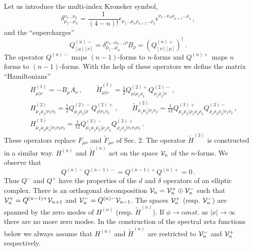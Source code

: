 \documentclass[a4paper,12pt]{article}
\begin{document}
Let us introduce the multi-index Kroneker symbol,
\begin{equation}
\delta_{\mu_1\dots\mu_n}^{\nu_1\dots\nu_n}=\frac 1{(4-n)!}
\epsilon_{\mu_1\dots\mu_n\rho_{n+1}\dots\rho_4}
\epsilon^{\nu_1\dots\nu_n\rho_{n+1}\dots\rho_4} \,,
\label{Kron}
\end{equation}
and the ``supercharges''
\begin{equation}
Q^{(n)-}_{[\mu ][\nu ]}=
\delta_{\mu_1\dots\mu_n}^{\nu_1\dots\nu_{n-1}\rho} B_\rho
=\left( Q^{(n)+}_{[\nu ][\mu ]} \right)^\dag \,.
\label{Q+-}
\end{equation}
The operator $Q^{(n)-}$ maps $(n-1)$-forms to $n$-forms and
$Q^{(n)+}$ maps $n$ forms to $(n-1)$-forms.
With the help of these operators we define the matrix
``Hamiltonians''
\begin{eqnarray}
&&H^{(1)}_{\mu |\nu}=-B_\mu A_\nu \,,\qquad
\tilde H^{(1)}_{\mu |\nu}=\frac 12 Q^{(2)+}_{\mu |\rho_1\rho_2}
Q^{(2)-}_{\rho_1\rho_2 |\nu} \,,           \nonumber \\
&&H^{(2)}_{\mu_1\mu_2 |\nu_1\nu_2}=\frac 12 
Q^{(2)-}_{\mu_1\mu_2 |\rho}Q^{(2)+}_{\rho |\nu_1\nu_2 }\,,
\qquad \tilde H^{(2)}_{\mu_1\mu_2 |\nu_1\nu_2}= \frac 1{12}
Q^{(3)+}_{\mu_1\mu_2 |\rho_1\rho_2\rho_3}
Q^{(3)-}_{\rho_1\rho_2\rho_3 |\nu_1\nu_2 } \,,      \nonumber \\
&&H^{(3)}_{ \mu_1\mu_2\mu_3 |\nu_1\nu_2\nu_3}=\frac 1{12}
Q^{(3)-}_{\mu_1\mu_2\mu_3 |\rho_1\rho_2}
Q^{(3)+}_{\rho_1\rho_2 |\nu_1\nu_2\nu_3} \,.       \label{matrH}
\end{eqnarray}
These operators replace $F_{\mu\nu}$ and $\tilde F_{\mu\nu}$
of Sec. 2.
The operator $\tilde H^{(3)}$ is constructed in a similar
way. $H^{(n)}$ and $\tilde H^{(n)}$ act on the space ${\cal V}_n$
of the $n$-forms.
We observe that
\begin{equation}
Q^{(n)-}Q^{(n-1)-}=Q^{(n-1)+}Q^{(n)+}=0 \,.\label{QQ0}
\end{equation}
Thus $Q^-$ and $Q^+$ have the properties of the $d$ and $\delta$
operators of an elliptic complex.
There is an orthogonal decomposition ${\cal V}_n=
{\cal V}_n^+\oplus{\cal V}_n^-$ such that ${\cal V}_n^+=
Q^{(n-1)+}{\cal V}_{n+1}$ and ${\cal V}_n^-=
Q^{(n)-}{\cal V}_{n-1}$. The spaces ${\cal V}_n^+$ (resp. 
${\cal V}_n^-$) are spanned by the zero modes of $H^{(n)}$
(resp. $\tilde H^{(n)}$). If $\phi\to const.$ as $|x|\to\infty$
there are no more zero modes. In the construction of the
spectral zeta functions below we always assume that $H^{(n)}$
and $\tilde H^{(n)}$ are restricted to ${\cal V}_n^-$ and
${\cal V}_n^+$ respectively. 
\end{document}
